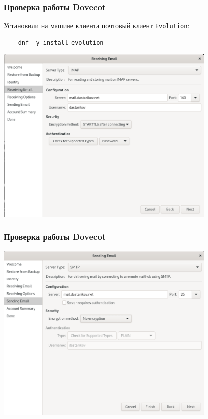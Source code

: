 \begin{frame}[fragile]
\frametitle{Проверка работы Dovecot}
Установили на машине клиента почтовый клиент \texttt{Evolution}:
\begin{verbatim}
    dnf -y install evolution
\end{verbatim}
    \centering
    \includegraphics[width=0.8\textwidth]{../images/image12.png}
\end{frame}

\begin{frame}
\frametitle{Проверка работы Dovecot}
    \centering
    \includegraphics[width=0.8\textwidth]{../images/image13.png}
\end{frame}


